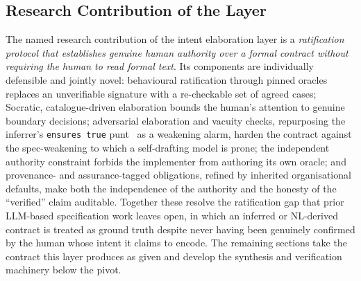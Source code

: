\subsection{Research Contribution of the Layer}
\label{subsec:intent_contribution}

The named research contribution of the intent elaboration layer is a \emph{ratification protocol that establishes genuine human authority over a formal contract without requiring the human to read formal text}. Its components are individually defensible and jointly novel: behavioural ratification through pinned oracles replaces an unverifiable signature with a re-checkable set of agreed cases; Socratic, catalogue-driven elaboration bounds the human's attention to genuine boundary decisions; adversarial elaboration and vacuity checks, repurposing the inferrer's \lstinline|ensures true| punt~\cite{edmonds_article1} as a weakening alarm, harden the contract against the spec-weakening to which a self-drafting model is prone; the independent authority constraint forbids the implementer from authoring its own oracle; and provenance- and assurance-tagged obligations, refined by inherited organisational defaults, make both the independence of the authority and the honesty of the ``verified'' claim auditable. Together these resolve the ratification gap that prior LLM-based specification work leaves open, in which an inferred or NL-derived contract is treated as ground truth despite never having been genuinely confirmed by the human whose intent it claims to encode. The remaining sections take the contract this layer produces as given and develop the synthesis and verification machinery below the pivot.
